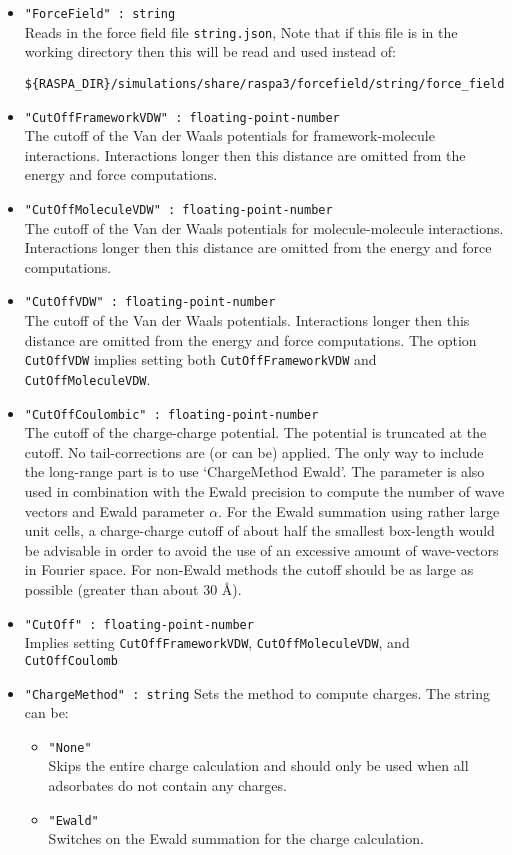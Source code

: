 \begin{itemize}
\item{\verb+"ForceField" : string+}\\
Reads in the force field file \verb+string.json+,
Note that if this file is in the working directory then this will be read and used instead of:
\begin{verbatim}
${RASPA_DIR}/simulations/share/raspa3/forcefield/string/force_field.json
\end{verbatim}
\item{\verb+"CutOffFrameworkVDW" : floating-point-number+}\\
The cutoff of the Van der Waals potentials for framework-molecule interactions. 
Interactions longer then this distance are omitted from the energy and force computations.
\item{\verb+"CutOffMoleculeVDW" : floating-point-number+}\\
The cutoff of the Van der Waals potentials for molecule-molecule interactions. 
Interactions longer then this distance are omitted from the energy and force computations.
\item{\verb+"CutOffVDW" : floating-point-number+}\\
The cutoff of the Van der Waals potentials. Interactions longer then this distance are omitted from the
energy and force computations. The option \verb+CutOffVDW+ implies setting both \verb+CutOffFrameworkVDW+
and \verb+CutOffMoleculeVDW+.
\item{\verb+"CutOffCoulombic" : floating-point-number+}\\
The cutoff of the charge-charge potential. The potential is truncated at the cutoff.
No tail-corrections are (or can be) applied. The only way to include the long-range part is to use `ChargeMethod Ewald'.
The parameter is also used in combination with the
Ewald precision to compute the number of wave vectors and Ewald parameter $\alpha$.
For the Ewald summation using rather large unit cells, a charge-charge cutoff of about half the smallest box-length would be advisable
in order to avoid the use of an excessive amount of wave-vectors in Fourier space. For non-Ewald methods the cutoff should be as large
as possible (greater than about 30 \AA).
\item{\verb+"CutOff" : floating-point-number+}\\
Implies setting \verb+CutOffFrameworkVDW+, \verb+CutOffMoleculeVDW+, and \verb+CutOffCoulomb+
\item{\verb+"ChargeMethod" : string+}
Sets the method to compute charges. The string can be:
  \begin{itemize}
  \item{\verb+"None"+}\\
    Skips the entire charge calculation and should only be used when all adsorbates do not contain any charges.
  \item{\verb+"Ewald"+}\\
    Switches on the Ewald summation for the charge calculation.
  \end{itemize}
\end{itemize}

